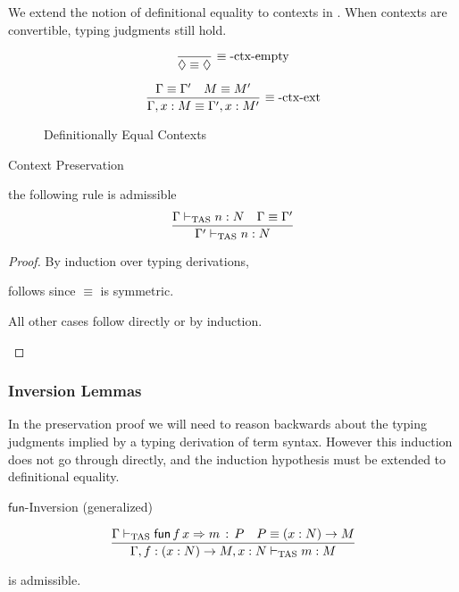 We extend the notion of definitional equality to contexts in .
When contexts are convertible, typing judgments still hold.
 
\begin{figure}
\[
\frac{\ }{\lozenge\equiv\lozenge}\,\rulename{\equiv-ctx-empty}
\]
 
\[
\frac{\Gamma\equiv\Gamma'\quad M\equiv M'}{\Gamma,x:M\equiv\Gamma',x:M'}\,\operatorname{\equiv-ctx-ext}
\]
 
\caption{Definitionally Equal Contexts}
\label{fig:surface-Context-Equiv}
\end{figure}
 
\begin{lem}
Context Preservation
 
the following rule is admissible
\[
\frac{\Gamma\vdash_{\mathrm{TAS}} n:N\quad\Gamma\equiv\Gamma'}{\Gamma'\vdash_{\mathrm{TAS}} n:N}
\]
\end{lem}
 
\begin{proof}
By induction over typing derivations,
 
\begin{casenv}
 \item {} follows since $\equiv$ is symmetric.
 \item All other cases follow directly or by induction.
\end{casenv}
\end{proof}
 
\subsubsection{Inversion Lemmas}
In the preservation proof we will need to reason backwards about the typing judgments implied by a typing derivation of term syntax.
However this induction does not go through directly, and the induction hypothesis must be extended to definitional equality. 
 
\begin{lem}
$\mathsf{fun}$-Inversion (generalized)
 
\[
\frac{\Gamma\vdash_{\mathrm{TAS}}\mathsf{fun}\,f\,x\Rightarrow m\,:\,P\quad P\equiv\left(x:N\right)\rightarrow M}{\Gamma,f:\left(x:N\right)\rightarrow M,x:N\vdash_{\mathrm{TAS}} m:M}
\]
 
is admissible.
\end{lem}
 
